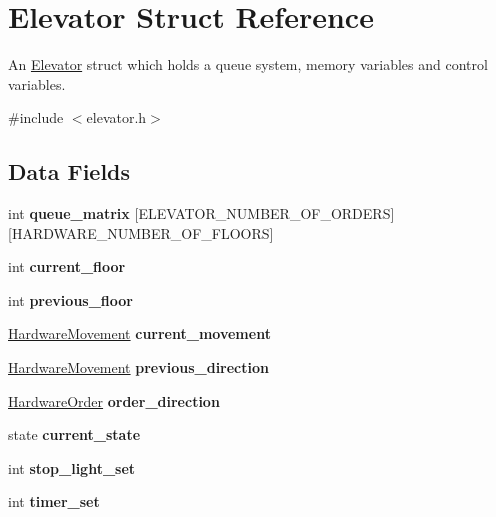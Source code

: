 \hypertarget{structElevator}{}\section{Elevator Struct Reference}
\label{structElevator}


An \hyperlink{structElevator}{Elevator} struct which holds a queue system, memory variables and control variables.  




{\ttfamily \#include $<$elevator.\+h$>$}

\subsection*{Data Fields}
\begin{DoxyCompactItemize}
\item 
\mbox{\label{structElevator_ae9a4535426a6d35fed788c74685a3a1d}} 
int {\bfseries queue\+\_\+matrix} \mbox{[}E\+L\+E\+V\+A\+T\+O\+R\+\_\+\+N\+U\+M\+B\+E\+R\+\_\+\+O\+F\+\_\+\+O\+R\+D\+E\+RS\mbox{]}\mbox{[}H\+A\+R\+D\+W\+A\+R\+E\+\_\+\+N\+U\+M\+B\+E\+R\+\_\+\+O\+F\+\_\+\+F\+L\+O\+O\+RS\mbox{]}
\item 
\mbox{\label{structElevator_aae297f56aca24d7be4518e2b14953015}} 
int {\bfseries current\+\_\+floor}
\item 
\mbox{\label{structElevator_a4872eeb2a2737ff0396fca606f8eaad8}} 
int {\bfseries previous\+\_\+floor}
\item 
\mbox{\label{structElevator_a787e17e94bf318d8757bbdf7ba0c7533}} 
\hyperlink{hardware_8h_a2167c399a24df296afc432bcb88228af}{Hardware\+Movement} {\bfseries current\+\_\+movement}
\item 
\mbox{\label{structElevator_a4fb7d656caf15d55bdb47a603c43054e}} 
\hyperlink{hardware_8h_a2167c399a24df296afc432bcb88228af}{Hardware\+Movement} {\bfseries previous\+\_\+direction}
\item 
\mbox{\label{structElevator_ae20f4287465b4f67528853bebd3d3896}} 
\hyperlink{hardware_8h_a796a8de8ce0ae769d7dbd3327a7bdbe7}{Hardware\+Order} {\bfseries order\+\_\+direction}
\item 
\mbox{\label{structElevator_ad09af9fded96d746e098af616a052ade}} 
state {\bfseries current\+\_\+state}
\item 
\mbox{\label{structElevator_a6f567852f3f96cc1a7d1fc15aa4c0ad8}} 
int {\bfseries stop\+\_\+light\+\_\+set}
\item 
\mbox{\label{structElevator_ab473c517dd118bdfd83928ec9afc9408}} 
int {\bfseries timer\+\_\+set}
\end{DoxyCompactItemize}


